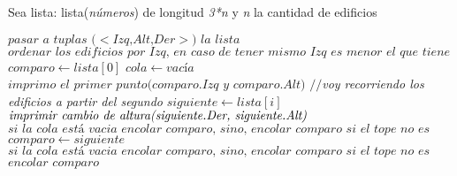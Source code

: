 \documentclass{article}
\begin{document}
Sea lista: lista(\textit{números}) de longitud \textit{3*n} y \textit{n} la cantidad de edificios
\vspace{0.4cm}
\begin{algorithmic}[1]
        \State $\textit{pasar a tuplas ($<$Izq,Alt,Der$>$) la lista}$
        \State $\textit{ordenar los edificios por Izq, en caso de tener mismo Izq es menor el que tiene mayor Alt}$
        \State $comparo\gets lista[0]$
        \State $cola\gets \textit{vacía}$
        \State $\textit{imprimo el primer punto(comparo.Izq y comparo.Alt)}$
         \textit{$//$voy recorriendo los edificios a partir del segundo}
                \State $siguiente\gets lista[i]$
                                \State $\textit{imprimir cambio de altura(\textit{siguiente.Der, siguiente.Alt})}$
                                \State$\textit{si la cola está vacia encolar comparo, sino, encolar comparo si el tope no es comparo}$                          
                                        \State $comparo\gets siguiente$
                        \EndIf
                                \State$\textit{si la cola está vacia encolar comparo, sino, encolar comparo si el tope no es comparo}$                          
                        \EndIf
                                \State $\textit{encolar comparo}$
                        \EndIf
                        

\end{algorithmic}
\end{document}

